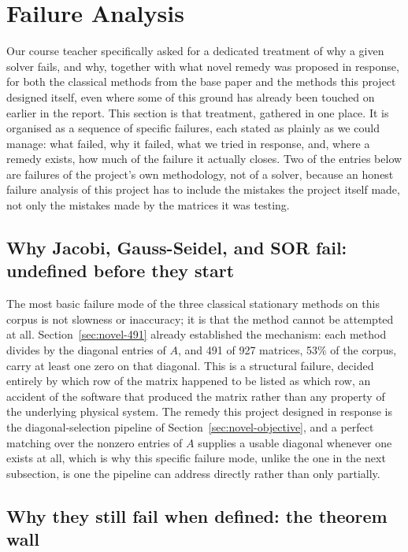 \documentclass[11pt,a4paper]{article}
\begin{document}
\clearpage
\section{Failure Analysis}
\label{sec:failure}

Our course teacher specifically asked for a dedicated treatment of why a given solver
fails, and why, together with what novel remedy was proposed in response, for both the
classical methods from the base paper and the methods this project designed itself, even
where some of this ground has already been touched on earlier in the report. This section
is that treatment, gathered in one place. It is organised as a sequence of specific
failures, each stated as plainly as we could manage: what failed, why it failed, what we
tried in response, and, where a remedy exists, how much of the failure it actually closes.
Two of the entries below are failures of the project's own methodology, not of a solver,
because an honest failure analysis of this project has to include the mistakes the
project itself made, not only the mistakes made by the matrices it was testing.

\subsection{Why Jacobi, Gauss-Seidel, and SOR fail: undefined before they start}
\label{sec:failure-undefined}

The most basic failure mode of the three classical stationary methods on this corpus is
not slowness or inaccuracy; it is that the method cannot be attempted at all.
Section~\ref{sec:novel-491} already established the mechanism: each method divides by the
diagonal entries of $A$, and 491 of 927 matrices, 53\% of the corpus, carry at least one
zero on that diagonal. This is a structural failure, decided entirely by which row of the
matrix happened to be listed as which row, an accident of the software that produced the
matrix rather than any property of the underlying physical system. The remedy this project
designed in response is the diagonal-selection pipeline of
Section~\ref{sec:novel-objective}, and a perfect matching over the nonzero entries of $A$
supplies a usable diagonal whenever one exists at all, which is why this specific failure
mode, unlike the one in the next subsection, is one the pipeline can address directly
rather than only partially.

\subsection{Why they still fail when defined: the theorem wall}
\label{sec:failure-theorem-wall}
\end{document}
